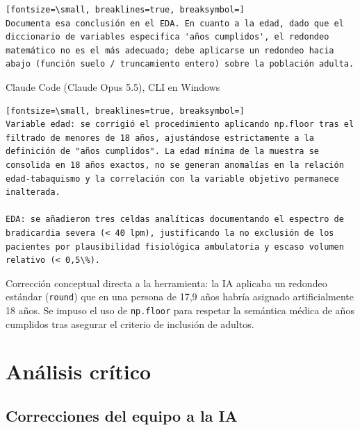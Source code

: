 \documentclass[12pt,a4paper,oneside]{book}
\begin{document}
\begin{iaprompt}
\begin{Verbatim}[fontsize=\small, breaklines=true, breaksymbol=]
Documenta esa conclusión en el EDA. En cuanto a la edad, dado que el diccionario de variables especifica 'años cumplidos', el redondeo matemático no es el más adecuado; debe aplicarse un redondeo hacia abajo (función suelo / truncamiento entero) sobre la población adulta.
\end{Verbatim}
\end{iaprompt}
\begin{iaresp}{Claude Code (Claude Opus 5.5), CLI en Windows}
\begin{Verbatim}[fontsize=\small, breaklines=true, breaksymbol=]
Variable edad: se corrigió el procedimiento aplicando np.floor tras el filtrado de menores de 18 años, ajustándose estrictamente a la definición de "años cumplidos". La edad mínima de la muestra se consolida en 18 años exactos, no se generan anomalías en la relación edad-tabaquismo y la correlación con la variable objetivo permanece inalterada.

EDA: se añadieron tres celdas analíticas documentando el espectro de bradicardia severa (< 40 lpm), justificando la no exclusión de los pacientes por plausibilidad fisiológica ambulatoria y escaso volumen relativo (< 0,5\%).
\end{Verbatim}
\end{iaresp}
\begin{iaanalisis}
Corrección conceptual directa a la herramienta: la IA aplicaba un redondeo estándar (\texttt{round}) que en una persona de 17,9 años habría asignado artificialmente 18 años. Se impuso el uso de \texttt{np.floor} para respetar la semántica médica de años cumplidos tras asegurar el criterio de inclusión de adultos.
\end{iaanalisis}

\chapter*{Análisis crítico}

\section*{Correcciones del equipo a la IA}
\end{document}

